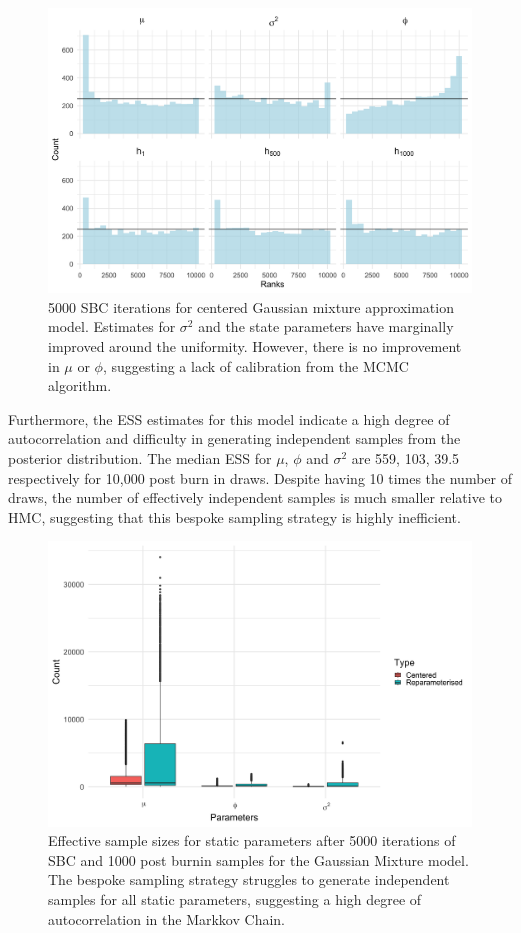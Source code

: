 \documentclass[12pt, a4paper]{article}
\begin{document}
    \begin{figure}[H]
        \centering
        \includegraphics[scale=0.1]{results/ksc_cp_5k.png}
        \caption{5000 SBC iterations for centered Gaussian mixture approximation model. Estimates for $\sigma^2$ and the state parameters have marginally improved around the uniformity. However, there is no improvement in $\mu$ or $\phi$, suggesting a lack of calibration from the MCMC algorithm.}
        \label{fig:cpksc5k}
    \end{figure}

    Furthermore, the ESS estimates for this model indicate a high degree of autocorrelation and difficulty in generating independent samples from the posterior distribution. The median ESS for $\mu$, $\phi$ and $\sigma^2$ are 559, 103, 39.5 respectively for 10,000 post burn in draws. Despite having 10 times the number of draws, the number of effectively independent samples is much smaller relative to HMC, suggesting that this bespoke sampling strategy is highly inefficient. 

    \begin{figure}[H]
        \centering
        \includegraphics[scale=0.1]{results/ksc_ess.png}
        \caption{Effective sample sizes for static parameters after 5000 iterations of SBC and 1000 post burnin samples for the Gaussian Mixture model. The bespoke sampling strategy struggles to generate independent samples for all static parameters, suggesting a high degree of autocorrelation in the Markkov Chain.}
        \label{fig:kscess}
    \end{figure}
\end{document}

